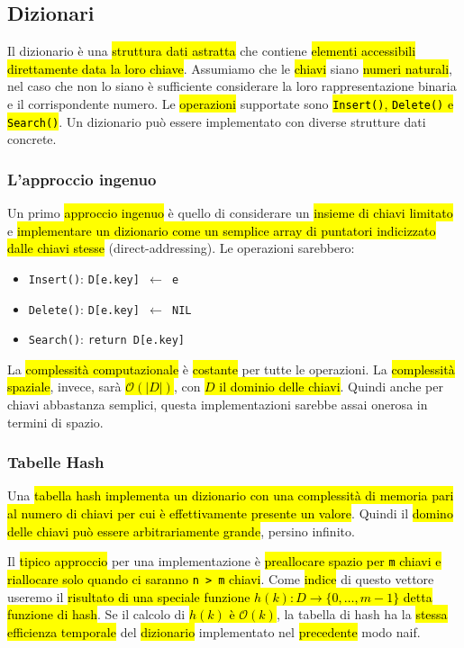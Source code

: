 \documentclass[a4paper,11pt,twoside]{article}
\theoremstyle{plain}
\theoremstyle{definition}
\theoremstyle{remark}
\newcommand{\peq}{$\gets$}
\begin{document}
\subsection{Dizionari}\label{sec:dictionary}

Il dizionario è una \hl{struttura dati astratta} che contiene \hl{elementi
accessibili direttamente data la loro chiave}. Assumiamo che le \hl{chiavi}
siano \hl{numeri naturali}, nel caso che non lo siano è sufficiente considerare
la loro rappresentazione binaria e il corrispondente numero. Le \hl{operazioni}
supportate sono \hl{\texttt{Insert()}, \texttt{Delete()} e \texttt{Search()}}.
Un dizionario può essere implementato con diverse strutture dati concrete.

\subsubsection{L'approccio ingenuo}\label{sec:dictionary-key-array}

Un primo \hl{approccio ingenuo} è quello di considerare un \hl{insieme di chiavi limitato}
e \hl{implementare un dizionario come un semplice array di puntatori indicizzato
dalle chiavi stesse} (direct-addressing). Le operazioni sarebbero:

\begin{itemize}
  \item \texttt{Insert()}: \texttt{D[e.key] \peq{} e}
  \item \texttt{Delete()}: \texttt{D[e.key] \peq{} NIL}
  \item \texttt{Search()}: \texttt{return D[e.key]}
\end{itemize}

La \hl{complessità computazionale} è \hl{costante} per tutte le operazioni. La
\hl{complessità spaziale}, invece, sarà \hl{$\mathcal{O}(|D|)$}, con \hl{$D$ il
dominio delle chiavi}. Quindi anche per chiavi abbastanza semplici, questa
implementazioni sarebbe assai onerosa in termini di spazio.

\subsubsection{Tabelle Hash}\label{sec:hash-tables}

Una \hl{tabella hash implementa un dizionario con una complessità di memoria
pari al numero di chiavi per cui è effettivamente presente un valore}. Quindi il
\hl{domino delle chiavi può essere arbitrariamente grande}, persino infinito.

Il \hl{tipico approccio} per una implementazione è \hl{preallocare spazio per
\texttt{m} chiavi e riallocare solo quando ci saranno \texttt{n > m} chiavi}.
Come \hl{indice} di questo vettore useremo il \hl{risultato di una speciale
funzione $h(k): D \to \{0, \ldots, m-1\}$ detta funzione di hash}. Se il calcolo
di \hl{$h(k)$ è $\mathcal{O}(k)$}, la tabella di hash ha la \hl{stessa
efficienza temporale} del \hl{dizionario} implementato nel \hl{precedente} modo
naif.
\end{document}
